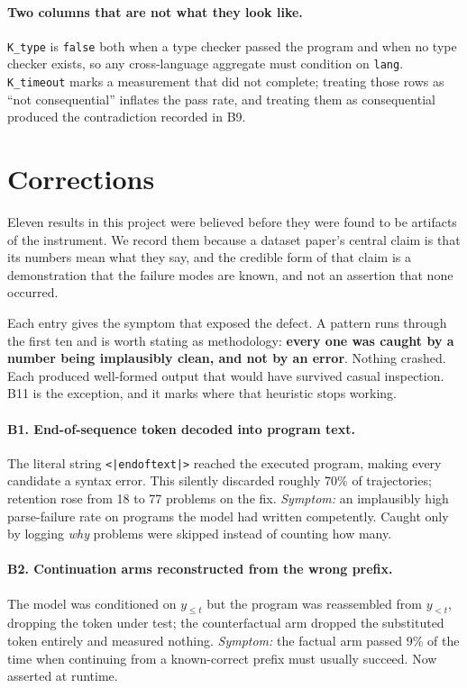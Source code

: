 \paragraph{Two columns that are not what they look like.} \texttt{K\_type} is \texttt{false} both
when a type checker passed the program and when no type checker exists, so any cross-language
aggregate must condition on \texttt{lang}. \texttt{K\_timeout} marks a measurement that did not
complete; treating those rows as ``not consequential'' inflates the pass rate, and treating them as
consequential produced the contradiction recorded in B9.

\section{Corrections}
\label{app:corrections}

Eleven results in this project were believed before they were found to be artifacts of the
instrument. We record them because a dataset paper's central claim is that its numbers mean what
they say, and the credible form of that claim is a demonstration that the failure modes are known,
and not an assertion that none occurred.

Each entry gives the symptom that exposed the defect. A pattern runs through the first ten and is
worth stating as methodology: \textbf{every one was caught by a number being implausibly clean, and
not by an error}. Nothing crashed. Each produced well-formed output that would have survived casual
inspection. B11 is the exception, and it marks where that heuristic stops working.

\paragraph{B1. End-of-sequence token decoded into program text.} The literal string
\texttt{<|endoftext|>} reached the executed program, making every candidate a syntax error. This
silently discarded roughly 70\% of trajectories; retention rose from 18 to 77 problems on the fix.
\emph{Symptom:} an implausibly high parse-failure rate on programs the model had written
competently. Caught only by logging \emph{why} problems were skipped instead of counting how many.

\paragraph{B2. Continuation arms reconstructed from the wrong prefix.} The model was conditioned on
$y_{\leq t}$ but the program was reassembled from $y_{<t}$, dropping the token under test; the
counterfactual arm dropped the substituted token entirely and measured nothing.
\emph{Symptom:} the factual arm passed 9\% of the time when continuing from a known-correct prefix
must usually succeed. Now asserted at runtime.

